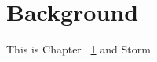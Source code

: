 \chapter{Background}
\label{chap:background}

This is Chapter~ \ref{chap:background} and Storm \cite{Aniello:2013:AOS:2488222.2488267}
